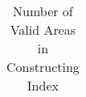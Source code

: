 \begin{table}[t]
{\begin{tabular}{cccccc}
\end{tabular}
}
\caption{Number of Valid Areas in Constructing Index}
\label{tbl-valid-areas}
\end{table}
